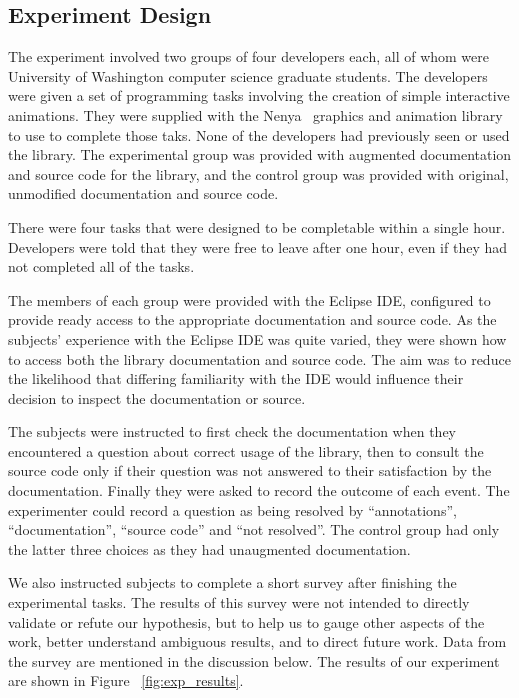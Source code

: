 \subsection{Experiment Design}
The experiment involved two groups of four developers each, all of whom were
University of Washington computer science graduate students. The developers
were given a set of programming tasks involving the creation of simple
interactive animations. They were supplied with the Nenya~\cite{nenya} graphics
and animation library to use to complete those taks. None of the developers had
previously seen or used the library. The experimental group was provided with
augmented documentation and source code for the library, and the control group
was provided with original, unmodified documentation and source code.

There were four tasks that were designed to be completable within a single
hour. Developers were told that they were free to leave after one hour, even if
they had not completed all of the tasks.

The members of each group were provided with the Eclipse IDE, configured to
provide ready access to the appropriate documentation and source code. As the
subjects' experience with the Eclipse IDE was quite varied, they were shown how
to access both the library documentation and source code. The aim was to reduce
the likelihood that differing familiarity with the IDE would influence their
decision to inspect the documentation or source.

The subjects were instructed to first check the documentation when they
encountered a question about correct usage of the library, then to consult the
source code only if their question was not answered to their satisfaction by
the documentation. Finally they were asked to record the outcome of each event.
The experimenter could record a question as being resolved by ``annotations'',
``documentation'', ``source code'' and ``not resolved''. The control group had
only the latter three choices as they had unaugmented documentation.

We also instructed subjects to complete a short survey after finishing the
experimental tasks. The results of this survey were not intended to directly
validate or refute our hypothesis, but to help us to gauge other aspects of the
work, better understand ambiguous results, and to direct future work. Data from
the survey are mentioned in the discussion below. The results of our experiment
are shown in Figure ~\ref{fig:exp_results}.

